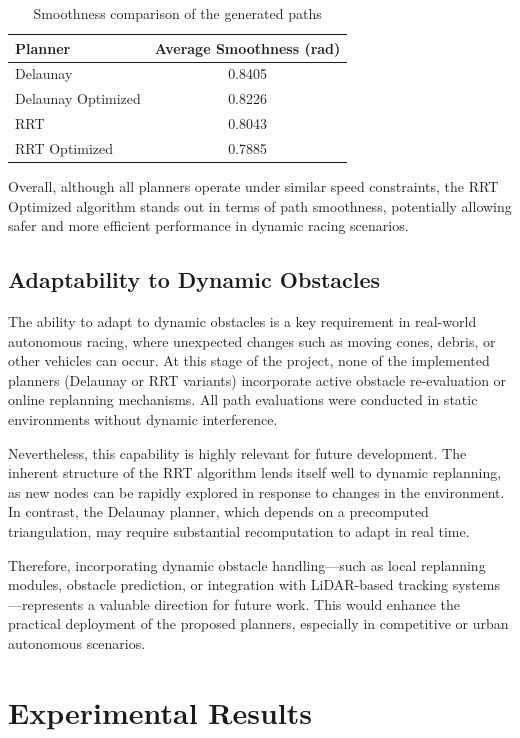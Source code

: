 \documentclass[a4paper,11pt]{report}
\begin{document}
\begin{table}[H]
\centering
\begin{tabular}{|l|c|}
\hline
\textbf{Planner} & \textbf{Average Smoothness (rad)} \\
\hline
Delaunay & 0.8405 \\
Delaunay Optimized & 0.8226 \\
RRT & 0.8043 \\
RRT Optimized & 0.7885 \\
\hline
\end{tabular}
\caption{Smoothness comparison of the generated paths}
\end{table}

Overall, although all planners operate under similar speed constraints, the RRT Optimized algorithm stands out in terms of path smoothness, potentially allowing safer and more efficient performance in dynamic racing scenarios.


\subsection{Adaptability to Dynamic Obstacles}

The ability to adapt to dynamic obstacles is a key requirement in real-world autonomous racing, where unexpected changes such as moving cones, debris, or other vehicles can occur. At this stage of the project, none of the implemented planners (Delaunay or RRT variants) incorporate active obstacle re-evaluation or online replanning mechanisms. All path evaluations were conducted in static environments without dynamic interference.

Nevertheless, this capability is highly relevant for future development. The inherent structure of the RRT algorithm lends itself well to dynamic replanning, as new nodes can be rapidly explored in response to changes in the environment. In contrast, the Delaunay planner, which depends on a precomputed triangulation, may require substantial recomputation to adapt in real time.

Therefore, incorporating dynamic obstacle handling—such as local replanning modules, obstacle prediction, or integration with LiDAR-based tracking systems—represents a valuable direction for future work. This would enhance the practical deployment of the proposed planners, especially in competitive or urban autonomous scenarios.



\section{Experimental Results}
\end{document}
